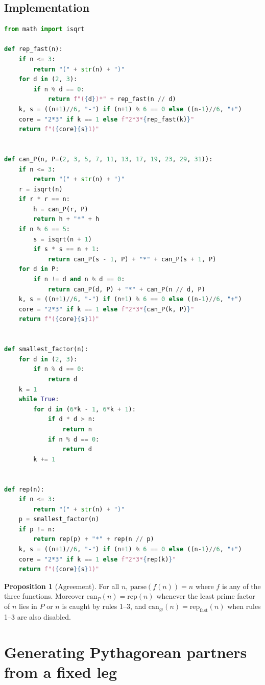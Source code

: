 \documentclass[11pt]{article}
\theoremstyle{definition}
\newtheorem{proposition}{Proposition}
\begin{document}
\subsection{Implementation}

\begin{lstlisting}[language=Python]
from math import isqrt

def rep_fast(n):
    if n <= 3:
        return "(" + str(n) + ")"
    for d in (2, 3):
        if n % d == 0:
            return f"({d})*" + rep_fast(n // d)
    k, s = ((n+1)//6, "-") if (n+1) % 6 == 0 else ((n-1)//6, "+")
    core = "2*3" if k == 1 else f"2*3*{rep_fast(k)}"
    return f"({core}{s}1)"


def can_P(n, P=(2, 3, 5, 7, 11, 13, 17, 19, 23, 29, 31)):
    if n <= 3:
        return "(" + str(n) + ")"
    r = isqrt(n)
    if r * r == n:
        h = can_P(r, P)
        return h + "*" + h
    if n % 6 == 5:
        s = isqrt(n + 1)
        if s * s == n + 1:
            return can_P(s - 1, P) + "*" + can_P(s + 1, P)
    for d in P:
        if n != d and n % d == 0:
            return can_P(d, P) + "*" + can_P(n // d, P)
    k, s = ((n+1)//6, "-") if (n+1) % 6 == 0 else ((n-1)//6, "+")
    core = "2*3" if k == 1 else f"2*3*{can_P(k, P)}"
    return f"({core}{s}1)"


def smallest_factor(n):
    for d in (2, 3):
        if n % d == 0:
            return d
    k = 1
    while True:
        for d in (6*k - 1, 6*k + 1):
            if d * d > n:
                return n
            if n % d == 0:
                return d
        k += 1


def rep(n):
    if n <= 3:
        return "(" + str(n) + ")"
    p = smallest_factor(n)
    if p != n:
        return rep(p) + "*" + rep(n // p)
    k, s = ((n+1)//6, "-") if (n+1) % 6 == 0 else ((n-1)//6, "+")
    core = "2*3" if k == 1 else f"2*3*{rep(k)}"
    return f"({core}{s}1)"
\end{lstlisting}

\begin{proposition}[Agreement]
For all $n$, $\mathrm{parse}(f(n)) = n$ where $f$ is any of the three
functions. Moreover $\mathrm{can}_P(n) = \mathrm{rep}(n)$ whenever the least
prime factor of $n$ lies in $P$ or $n$ is caught by rules 1--3, and
$\mathrm{can}_{\varnothing}(n) = \mathrm{rep}_{\mathrm{fast}}(n)$ when rules
1--3 are also disabled.
\end{proposition}
\section{Generating Pythagorean partners from a fixed leg}
\end{document}
